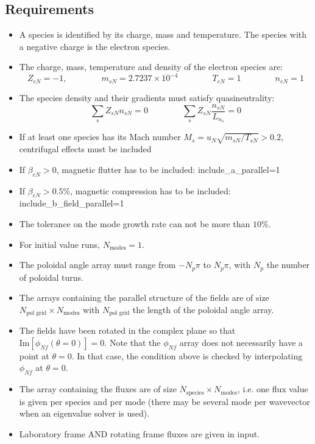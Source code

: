 \documentclass[a4paper]{report}
\begin{document}
\subsection{Requirements}
\begin{itemize}
\item A species is identified by its charge, mass and temperature. The species with a negative charge is the electron species.
\item The charge, mass, temperature and density of the electron species are:
\begin{equation}
 Z_{eN}=-1, \qquad \qquad m_{sN} = 2.7237\times 10^{-4} \qquad \qquad T_{eN}=1 \qquad \qquad n_{eN}=1
\end{equation}
\item The species density and their gradients must satisfy quasineutrality:
\begin{equation}
 \sum_s Z_{sN}n_{sN} = 0 \qquad \qquad \sum_s Z_{sN}\frac{n_{sN}}{L_{n_s}}=0
\end{equation}
\item If at least one species has its Mach number $M_s=u_N\sqrt{m_{sN}/T_{sN}}>0.2$, centrifugal effects must be included
\item If $\beta_{eN}>0$, magnetic flutter has to be included: include\_a\_parallel=1
\item If $\beta_{eN}>0.5\%$, magnetic compression has to be included: include\_b\_field\_parallel=1
\item The tolerance on the mode growth rate can not be more than $10\%$.
\item For initial value runs, $N_\textrm{modes}=1$.
\item The poloidal angle array must range from $-N_p \pi$ to $N_p \pi$, with $N_p$ the number of poloidal turns.
\item The arrays containing the parallel structure of the fields are of size $N_\textrm{pol grid}\times N_\textrm{modes}$ with $N_\textrm{pol grid}$ the length of the poloidal angle array.
\item The fields have been rotated in the complex plane so that $\textrm{Im}\left[\phi_{Nf}(\theta=0)\right]=0$. Note that the $\phi_{Nf}$ array does not necessarily have a point at $\theta=0$. In that case, the condition above is checked by interpolating $\phi_{Nf}$ at $\theta=0$.
\item The array containing the fluxes are of size $N_\textrm{species}\times N_\textrm{modes}$, i.e. one flux value is given per species and per mode (there may be several mode per wavevector when an eigenvalue solver is used).
\item Laboratory frame AND rotating frame fluxes are given in input.
\end{itemize}
\end{document}
